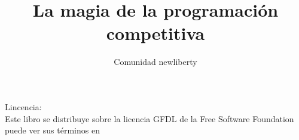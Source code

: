 \documentclass[11pt,a4paper]{book}
\author{Comunidad newliberty}
\title{La magia de la programación competitiva}
\begin{document}


\maketitle
\tableofcontents
\cleardoublepage
{}
\listoffigures
\cleardoublepage
{}
\listoftables
\cleardoublepage

\noindent Lincencia:\\

Este libro se distribuye sobre la licencia GFDL de la Free Software Foundation puede ver sus términos en \cite{GFDL:Online}








\cleardoublepage
{}

\end{document}

